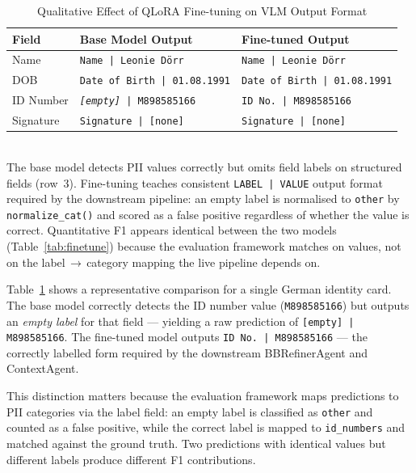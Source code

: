 \documentclass[conference]{IEEEtran}
\begin{document}
\begin{table}[h]\centering
\caption{Qualitative Effect of QLoRA Fine-tuning on VLM Output Format}
\label{tab:finetune_qual}
\begin{tabular}{lll}
\toprule
Field & Base Model Output & Fine-tuned Output \\
\midrule
Name      & \texttt{Name | Leonie D\"{o}rr}         & \texttt{Name | Leonie D\"{o}rr} \\
DOB       & \texttt{Date of Birth | 01.08.1991}    & \texttt{Date of Birth | 01.08.1991} \\
ID Number & \texttt{\textit{[empty]} | M898585166} & \texttt{ID No. | M898585166} \\
Signature & \texttt{Signature | [none]}             & \texttt{Signature | [none]} \\
\bottomrule
\end{tabular}
\vspace{2pt}\\
\footnotesize{The base model detects PII values correctly but omits field labels on
structured fields (row~3). Fine-tuning teaches consistent \texttt{LABEL\,|\,VALUE}
output format required by the downstream pipeline: an empty label is normalised to
\texttt{other} by \texttt{normalize\_cat()} and scored as a false positive regardless
of whether the value is correct. Quantitative F1 appears identical between the two
models (Table~\ref{tab:finetune}) because the evaluation framework matches on values,
not on the label\,$\rightarrow$\,category mapping the live pipeline depends on.}
\end{table}

Table~\ref{tab:finetune_qual} shows a representative
comparison for a single German identity card.
The base model correctly detects the ID number value
(\texttt{M898585166}) but outputs an \emph{empty
label} for that field --- yielding a raw prediction
of \texttt{[empty] | M898585166}.
The fine-tuned model outputs \texttt{ID No. |
M898585166} --- the correctly labelled form required
by the downstream BBRefinerAgent and ContextAgent.

This distinction matters because the evaluation
framework maps predictions to PII categories via
the label field: an empty label is classified as
\texttt{other} and counted as a false positive,
while the correct label is mapped to
\texttt{id\_numbers} and matched against the ground
truth.
Two predictions with identical values but different
labels produce different F1 contributions.
\end{document}
